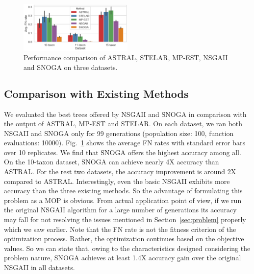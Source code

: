 \begin{figure} [htbp]
		\centering
		\includegraphics[width=0.5\textwidth]{Figure/all_dataset_compare}
		\caption{Performance comparison of ASTRAL, STELAR, MP-EST, NSGAII and SNOGA on three datasets. 
		} \label{fig:compare_exisitng_methods}
\end{figure}

\subsection{Comparison with Existing Methods}
We evaluated the best trees offered by NSGAII and SNOGA in comparison with the output of ASTRAL, MP-EST and STELAR. On each dataset, we ran both NSGAII and SNOGA only for 99 generations (population size: 100, function evaluations: 10000). 
Fig.~\ref{fig:compare_exisitng_methods} shows the average FN rates with standard error bars over 10 replicates. We find that SNOGA offers the highest accuracy among all. On the 10-taxon dataset, SNOGA can achieve nearly 4X accuracy than ASTRAL. For the rest two datasets, the accuracy improvement is around 2X compared to ASTRAL. Interestingly, even the basic NSGAII exhibits more accuracy than the three existing methods. So the advantage of formulating this problem as a MOP is obvious. From actual application point of view, if we run the original NSGAII algorithm for a large number of generations its accuracy may fall for not resolving the issues mentioned in Section~\ref{sec:problem} properly which we saw earlier. Note that the FN rate is not the fitness criterion of the optimization process. Rather, the optimization continues based on the objective values.
So we can state that, owing to the characteristics designed considering the problem nature, SNOGA achieves at least 1.4X accuracy gain over the original NSGAII in all datasets. 




